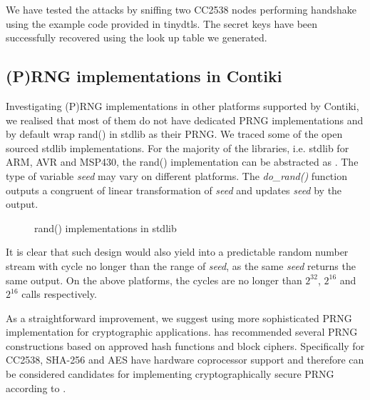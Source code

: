 We have tested the attacks by sniffing two CC2538 nodes performing handshake using the example code provided in tinydtls. The secret keys have been successfully recovered using the look up table we generated.

\subsection{(P)RNG implementations in Contiki}\label{PRNGReflection}
Investigating (P)RNG implementations in other platforms supported by Contiki, we realised that most of them do not have dedicated PRNG implementations and by default wrap rand() in stdlib as their PRNG. We traced some of the open sourced stdlib implementations. For the majority of the libraries, i.e. stdlib for ARM\cite{ARMrand}, AVR\cite{AVRrand} and MSP430\cite{MSP430rand}, the rand() implementation can be abstracted as . The type of variable \textit{seed}  may vary on different platforms. The \textit{do\_rand()} function outputs a congruent of linear transformation of \textit{seed} and updates \textit{seed} by the output.
 
\begin{figure}

\caption{rand() implementations in stdlib}
\label{rand}
\end{figure}

It is clear that such design would also yield into a predictable random number stream with cycle no longer than the range of \textit{seed}, as the same \textit{seed} returns the same output. On the above platforms, the cycles are no longer than $2^{32}$, $2^{16}$ and $2^{16}$ calls respectively.

As a straightforward improvement, we suggest using more sophisticated PRNG implementation for cryptographic applications. \cite{NISTPRNG} has recommended several PRNG constructions based on approved hash functions and block ciphers. Specifically for CC2538, SHA-256 and AES have hardware coprocessor support and therefore can be considered candidates for implementing cryptographically secure PRNG according to \cite{NISTPRNG}.